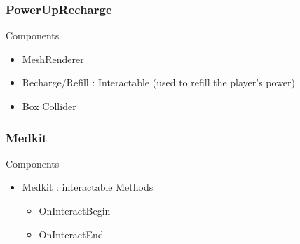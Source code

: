 \documentclass[11pt]{article}
\begin{document}
\subsubsection{PowerUpRecharge}
Components
\begin{itemize}
\item MeshRenderer
\item Recharge/Refill : Interactable (used to refill the player’s power)
\item Box Collider
\end{itemize}

\subsubsection{Medkit}
Components
\begin{itemize}
\item Medkit : interactable
\newline Methods
\begin{itemize}
\item OnInteractBegin
\item OnInteractEnd
\end{itemize}
\end{itemize}
\end{document}

